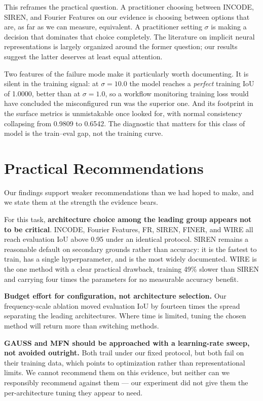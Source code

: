 This reframes the practical question. A practitioner choosing between INCODE, SIREN, and Fourier Features on our evidence is choosing between options that are, as far as we can measure, equivalent. A practitioner setting $\sigma$ is making a decision that dominates that choice completely. The literature on implicit neural representations is largely organized around the former question; our results suggest the latter deserves at least equal attention.

Two features of the failure mode make it particularly worth documenting. It is silent in the training signal: at $\sigma = 10.0$ the model reaches a \emph{perfect} training IoU of 1.0000, better than at $\sigma = 1.0$, so a workflow monitoring training loss would have concluded the misconfigured run was the superior one. And its footprint in the surface metrics is unmistakable once looked for, with normal consistency collapsing from 0.9809 to 0.6542. The diagnostic that matters for this class of model is the train--eval gap, not the training curve.

\section{Practical Recommendations}

Our findings support weaker recommendations than we had hoped to make, and we state them at the strength the evidence bears.

For this task, \textbf{architecture choice among the leading group appears not to be critical}. INCODE, Fourier Features, FR, SIREN, FINER, and WIRE all reach evaluation IoU above 0.95 under an identical protocol. SIREN remains a reasonable default on secondary grounds rather than accuracy: it is the fastest to train, has a single hyperparameter, and is the most widely documented. WIRE is the one method with a clear practical drawback, training 49\% slower than SIREN and carrying four times the parameters for no measurable accuracy benefit.

\textbf{Budget effort for configuration, not architecture selection.} Our frequency-scale ablation moved evaluation IoU by fourteen times the spread separating the leading architectures. Where time is limited, tuning the chosen method will return more than switching methods.

\textbf{GAUSS and MFN should be approached with a learning-rate sweep, not avoided outright.} Both trail under our fixed protocol, but both fail on their training data, which points to optimization rather than representational limits. We cannot recommend them on this evidence, but neither can we responsibly recommend against them --- our experiment did not give them the per-architecture tuning they appear to need.

